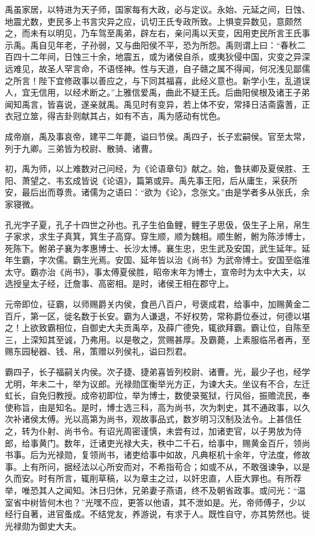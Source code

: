 \documentclass[]{article}
\begin{document}
禹虽家居，以特进为天子师，国家每有大政，必与定议。永始、元延之间，日蚀、地震尤数，吏民多上书言灾异之应，讥切王氏专政所致。上惧变异数见，意颇然之，而未有以明见，乃车驾至禹弟，辟左右，亲问禹以天变，因用吏民所言王氏事示禹。禹自见年老，子孙弱，又与曲阳侯不平，恐为所怨。禹则谓上曰：``春秋二百四十二年间，日蚀三十余，地震五，或为诸侯自杀，或夷狄侵中国，灾变之异深远难见，故圣人罕言命，不语怪神。性与天道，自子赣之属不得闻，何况浅见鄙儒之所言！陛下宜修政事以善应之，与下同其福喜，此经义意也。新学小生，乱道误人，宜无信用，以经术断之。''上雅信爱禹，曲此不疑王氏。后曲阳侯根及诸王子弟闻知禹言，皆喜说，遂亲就禹。禹见时有变异，若上体不安，常择日洁斋露蓍，正衣冠立筮，得吉卦则献其占，如有不吉，禹为感动有忧色。

成帝崩，禹及事哀帝，建平二年薨，谥曰节侯。禹四子，长子宏嗣侯。官至太常，列于九卿。三弟皆为校尉、散骑、诸曹。

初，禹为师，以上难数对己问经，为《论语章句》献之。始，鲁扶卿及夏侯胜、王阳、萧望之、韦玄成皆说《论语》，篇第或异。禹先事王阳，后从庸生，采获所安，最后出而尊贵。诸儒为之语曰：``欲为《论》，念张文。''由是学者多从张氏，余家寝微。

孔光字子夏，孔子十四世之孙也。孔子生伯鱼鲤，鲤生子思伋，伋生子上帛，帛生子家求，求生子真箕，箕生子高穿。穿生顺，顺为魏相。顺生鲋，鲋为陈涉博士，死陈下。鲋弟子襄为孝惠博士、长沙太博。襄生忠，忠生武及安国，武生延年。延年生霸，字次儒。霸生光焉。安国、延年皆以治《尚书》为武帝博士。安国至临淮太守。霸亦治《尚书》，事太傅夏侯胜，昭帝末年为博士，宣帝时为太中大夫，以选授皇太子经，迁詹事、高密相。是时，诸侯王相在郡守上。

元帝即位，征霸，以师赐爵关内侯，食邑八百户，号褒成君，给事中，加赐黄金二百斤，第一区，徙名数于长安。霸为人谦退，不好权势，常称爵位泰过，何德以堪之！上欲致霸相位，自御史大夫贡禹卒，及薛广德免，辄欲拜霸。霸让位，自陈至三，上深知其至诚，乃弗用。以是敬之，赏赐甚厚。及霸薨，上素服临吊者再，至赐东园秘器、钱、帛，策赠以列侯礼，谥曰烈君。

霸四子，长子福嗣关内侯。次子捷、捷弟喜皆列校尉、诸曹。光，最少子也，经学尤明，年未二十，举为议郎。光禄勋匡衡举光方正，为谏大夫。坐议有不合，左迁虹长，自免归教授。成帝初即位，举为博士，数使录冤狱，行风俗，振赡流民，奉使称旨，由是知名。是时，博士选三科，高为尚书，次为刺史，其不通政事，以久次补诸侯太傅。光以高第为尚书，观故事品式，数岁明习汉制及法令。上甚信任之，转为仆射、尚书令。有诏光周密谨慎，未尝有过，加诸吏官，以子男放为侍郎，给事黄门。数年，迁诸吏光禄大夫，秩中二千石，给事中，赐黄金百斤，领尚书事。后为光禄勋，复领尚书，诸吏给事中如故，凡典枢机十余年，守法度，修故事。上有所问，据经法以心所安而对，不希指苟合；如或不从，不敢强谏争，以是久而安。时有所言，辄削草稿，以为章主之过，以奸忠直，人臣大罪也。有所荐举，唯恐其人之闻知。沐日归休，兄弟妻子燕语，终不及朝省政事。或问光：``温室省中树皆何木也？''光嘿不应，更答以他语，其不泄如是。光，帝师傅子，少以经行自著，进官蚤成。不结党友，养游说，有求于人。既性自守，亦其势然也。徙光禄勋为御史大夫。
\end{document}
